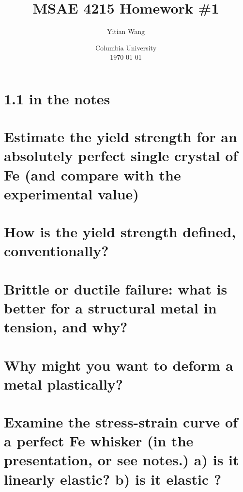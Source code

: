 \documentclass{article}
\title{MSAE 4215 Homework \#1}
\author{Yitian Wang}
\date{Columbia University \\ \today}
\begin{document}
\maketitle
\section{1.1 in the notes}

\section{Estimate the yield strength for an absolutely perfect single crystal of Fe 
(and compare with the experimental value)}

\section{How is the yield strength defined, conventionally?}

\section{Brittle or ductile failure: what is better for a structural metal in tension, and why?}

\section{Why might you want to deform a metal plastically?}

\section{Examine the stress-strain curve of a perfect Fe whisker (in the presentation, or see notes.)  
a) is it linearly elastic?  b) is it elastic ?}
\end{document}
